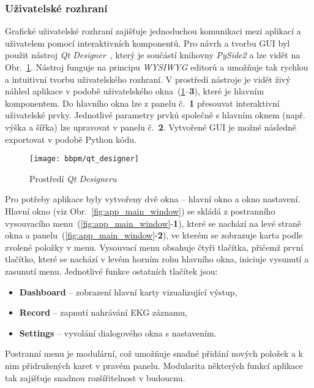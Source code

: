 \subsubsection{Uživatelské rozhraní}
\label{section:gui}
Grafické uživatelské rozhraní zajišťuje jednoduchou komunikaci mezi aplikací a
uživatelem pomocí interaktivních komponentů. Pro návrh a tvorbu GUI byl použit
nástroj \textit{Qt Designer}~\cite{QtDesigner}, který je součástí knihovny
\textit{PySide2} a lze vidět na Obr.~\ref{fig:qt_designer}. Nástroj funguje na
principu \textit{WYSIWYG} editorů a umožňuje tak rychlou a intuitivní tvorbu
uživatelského rozhraní. V prostředí nástroje je vidět živý náhled aplikace v
podobě uživatelského okna~(\ref{fig:qt_designer}--\textbf{3}), které je hlavním
komponentem. Do hlavního okna lze z panelu č.~\textbf{1} přesouvat interaktivní
uživatelské prvky. Jednotlivé parametry prvků společně s hlavním oknem (např.
výška a šířka) lze upravovat v panelu č.~\textbf{2}. Vytvořené GUI je možné
následně exportovat v podobě Python kódu.

\begin{figure}[h]
    \begin{center}
        \texttt{[image: bbpm/qt\_designer]}
        \caption{Prostředí \textit{Qt Designeru}}
        \label{fig:qt_designer}
    \end{center}
\end{figure}

Pro potřeby aplikace byly vytvořeny dvě okna -- hlavní okno a okno nastavení.
Hlavní okno (viz Obr.~\ref{fig:app_main_window}) se skládá z postranního
vysouvacího menu~(\ref{fig:app_main_window}-\textbf{1}), které se nachází na
levé straně okna a panelu~(\ref{fig:app_main_window}-\textbf{2}), ve kterém se
zobrazuje karta podle zvolené položky v menu. Vysouvací menu obsahuje čtyři
tlačítka, přičemž první tlačítko, které se nachází v levém horním rohu hlavního
okna, iniciuje vysunutí a zasunutí menu. Jednotlivé funkce ostatních tlačítek
jsou:
\begin{itemize}[noitemsep]
    \item \textbf{Dashboard} -- zobrazení hlavní karty vizualizující výstup,
    \item \textbf{Record} -- zapnutí nahrávání EKG záznamu,
    \item \textbf{Settings} -- vyvolání dialogového okna s nastavením.
\end{itemize}
Postranní menu je modulární, což umožňuje snadné přidání nových položek a k nim
přidružených karet v pravém panelu. Modularita některých funkcí aplikace tak
zajišťuje snadnou rozšířitelnost v budoucnu.

